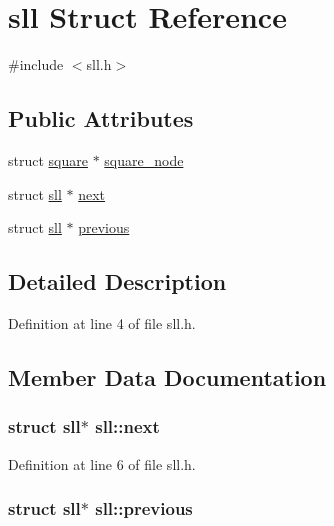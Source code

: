\hypertarget{structsll}{\section{sll Struct Reference}
\label{structsll}
}


{\ttfamily \#include $<$sll.\-h$>$}

\subsection*{Public Attributes}
\begin{DoxyCompactItemize}
\item 
struct \hyperlink{structsquare}{square} $\ast$ \hyperlink{structsll_a7ddb3d4d62928a1d4eaeb7af3fabf3f5}{square\-\_\-node}
\item 
struct \hyperlink{structsll}{sll} $\ast$ \hyperlink{structsll_ad9fa0568afde58d211c5307a34e6a5ac}{next}
\item 
struct \hyperlink{structsll}{sll} $\ast$ \hyperlink{structsll_a2180abeaba1dd7395e7540204906f590}{previous}
\end{DoxyCompactItemize}


\subsection{Detailed Description}


Definition at line 4 of file sll.\-h.



\subsection{Member Data Documentation}
\hypertarget{structsll_ad9fa0568afde58d211c5307a34e6a5ac}{
\subsubsection[{next}]{\setlength{\rightskip}{0pt plus 5cm}struct {\bf sll}$\ast$ sll\-::next}}\label{structsll_ad9fa0568afde58d211c5307a34e6a5ac}


Definition at line 6 of file sll.\-h.

\hypertarget{structsll_a2180abeaba1dd7395e7540204906f590}{
\subsubsection[{previous}]{\setlength{\rightskip}{0pt plus 5cm}struct {\bf sll}$\ast$ sll\-::previous}}\label{structsll_a2180abeaba1dd7395e7540204906f590}


